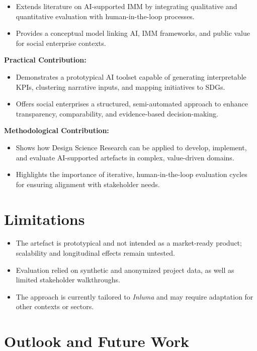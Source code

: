 \begin{itemize}
    \item Extends literature on AI-supported IMM by integrating qualitative and quantitative evaluation with human-in-the-loop processes.
    \item Provides a conceptual model linking AI, IMM frameworks, and public value for social enterprise contexts.
\end{itemize}

\textbf{Practical Contribution:}

\begin{itemize}
    \item Demonstrates a prototypical AI toolset capable of generating interpretable KPIs, clustering narrative inputs, and mapping initiatives to SDGs.
    \item Offers social enterprises a structured, semi-automated approach to enhance transparency, comparability, and evidence-based decision-making.
\end{itemize}

\textbf{Methodological Contribution:}

\begin{itemize}
    \item Shows how Design Science Research can be applied to develop, implement, and evaluate AI-supported artefacts in complex, value-driven domains.
    \item Highlights the importance of iterative, human-in-the-loop evaluation cycles for ensuring alignment with stakeholder needs.
\end{itemize}

\section{Limitations}\label{sec:limitations}

\begin{itemize}
    \item The artefact is prototypical and not intended as a market-ready product; scalability and longitudinal effects remain untested.
    \item Evaluation relied on synthetic and anonymized project data, as well as limited stakeholder walkthroughs.
    \item The approach is currently tailored to \textit{Inluma} and may require adaptation for other contexts or sectors.
\end{itemize}

\section{Outlook and Future Work}\label{sec:outlook}

